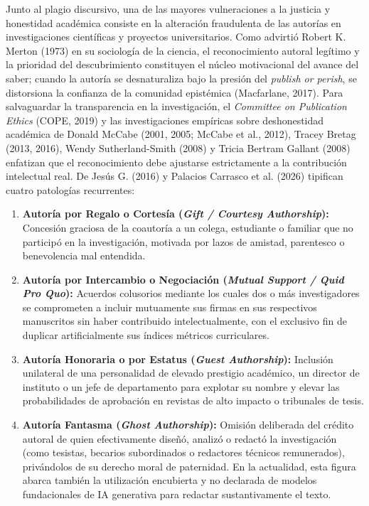 Junto al plagio discursivo, una de las mayores vulneraciones a la justicia y honestidad académica consiste en la alteración fraudulenta de las autorías en investigaciones científicas y proyectos universitarios. Como advirtió Robert K. Merton (1973) en su sociología de la ciencia, el reconocimiento autoral legítimo y la prioridad del descubrimiento constituyen el núcleo motivacional del avance del saber; cuando la autoría se desnaturaliza bajo la presión del \textit{publish or perish}, se distorsiona la confianza de la comunidad epistémica (Macfarlane, 2017). Para salvaguardar la transparencia en la investigación, el \textit{Committee on Publication Ethics} (COPE, 2019) y las investigaciones empíricas sobre deshonestidad académica de Donald McCabe (2001, 2005; McCabe et al., 2012), Tracey Bretag (2013, 2016), Wendy Sutherland-Smith (2008) y Tricia Bertram Gallant (2008) enfatizan que el reconocimiento debe ajustarse estrictamente a la contribución intelectual real. De Jesús G. (2016) y Palacios Carrasco et al. (2026) tipifican cuatro patologías recurrentes:

\begin{enumerate}
    \item \textbf{Autoría por Regalo o Cortesía (\textit{Gift / Courtesy Authorship}):} Concesión graciosa de la coautoría a un colega, estudiante o familiar que no participó en la investigación, motivada por lazos de amistad, parentesco o benevolencia mal entendida.
    \item \textbf{Autoría por Intercambio o Negociación (\textit{Mutual Support / Quid Pro Quo}):} Acuerdos colusorios mediante los cuales dos o más investigadores se comprometen a incluir mutuamente sus firmas en sus respectivos manuscritos sin haber contribuido intelectualmente, con el exclusivo fin de duplicar artificialmente sus índices métricos curriculares.
    \item \textbf{Autoría Honoraria o por Estatus (\textit{Guest Authorship}):} Inclusión unilateral de una personalidad de elevado prestigio académico, un director de instituto o un jefe de departamento para explotar su nombre y elevar las probabilidades de aprobación en revistas de alto impacto o tribunales de tesis.
    \item \textbf{Autoría Fantasma (\textit{Ghost Authorship}):} Omisión deliberada del crédito autoral de quien efectivamente diseñó, analizó o redactó la investigación (como tesistas, becarios subordinados o redactores técnicos remunerados), privándolos de su derecho moral de paternidad. En la actualidad, esta figura abarca también la utilización encubierta y no declarada de modelos fundacionales de IA generativa para redactar sustantivamente el texto.
\end{enumerate}

